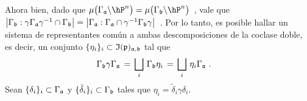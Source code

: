 Ahora bien, dado que
\begin{math}
	\mu\big(\Gamma_{\frak{a}}\backslash\hP^{n}\big)=
		\mu\big(\Gamma_{\frak{b}}\backslash\hP^{n}\big)
\end{math}~,
vale que
\begin{math}
	\big|\Gamma_{\frak{b}}:\gamma\Gamma_{\frak{a}}\gamma^{-1}\cap
		\Gamma_{\frak{b}}\big|=
	\big|\Gamma_{\frak{a}}:\Gamma_{\frak{a}}\cap\gamma^{-1}
		\Gamma_{\frak{b}}\gamma\big|
\end{math}~.
Por lo tanto, es posible hallar un sistema de representantes com\'{u}n a
ambas descomposiciones de la coclase doble, es decir, un conjunto
$\{\eta_{i}\}_{i}\subset\frak{I}(\frak{p})_{\frak{a},\frak{b}}$ tal que
\begin{align*}
	\Gamma_{\frak{b}}\gamma\Gamma_{\frak{a}} & \,=\,
		\bigsqcup_{i}\,\Gamma_{\frak{b}}\eta_{i} \,=\,
		\bigsqcup_{i}\,\eta_{i}\Gamma_{\frak{a}}
	\text{ .}
\end{align*}
%
Sean $\{\delta_{i}\}_{i}\subset\Gamma_{\frak{a}}$ y
$\{\tilde{\delta}_{i}\}_{i}\subset\Gamma_{\frak{b}}$ tales que
$\eta_{i}=\tilde{\delta}_{i}\gamma\delta_{i}$.

